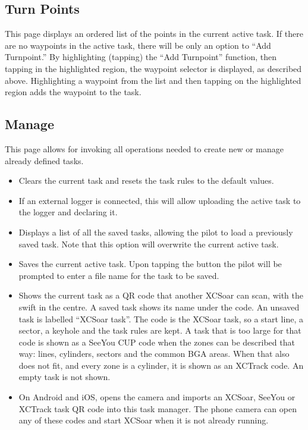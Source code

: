 \subsection*{Turn Points}
This page displays an ordered list of the points in the current active task.
If there are no waypoints in the active task, there
will be only an option to ``Add Turnpoint.''  By highlighting (tapping) the
``Add Turnpoint'' function, then tapping in the highlighted region, the waypoint
selector is displayed, as described above.  Highlighting a waypoint from the
list and then tapping on the highlighted region adds the waypoint to the task.

\subsection*{Manage}
This page allows for invoking all operations needed to create new or manage
already defined tasks.


\begin{itemize}
\item [\bmenuw{New Task}] Clears the current task and resets the task rules to
  the default values.
\item [\bmenuw{Declare}] If an external logger is connected, this will allow
  uploading the  active task to the logger and declaring it.
\item [\bmenuw{Browse}] Displays a list of all the saved tasks, allowing the
  pilot to load a previously saved task.  Note that this option will overwrite
  the current active task.
\item [\bmenuw{Save}] Saves the current active task.  Upon tapping the
   button the pilot will be prompted to enter a file name for the
  task to be saved.
\item [\bmenuw{Show QR Code}] Shows the current task as a QR code that
  another XCSoar can scan, with the swift in the centre.  A saved
  task shows its name under the code.  An unsaved task is labelled
  ``XCSoar task''.  The code is the XCSoar task, so a start line, a
  sector, a keyhole and the task rules are kept.  A task that is too
  large for that code is shown as a SeeYou CUP code when the zones
  can be described that way: lines, cylinders, sectors and the
  common BGA areas.  When that also does not fit, and every zone is a
  cylinder, it is shown as an XCTrack code.  An empty task is not
  shown.
\item [\bmenuw{Scan QR Code}] On Android and iOS, opens the camera and
  imports an XCSoar, SeeYou or XCTrack task QR code into this task manager.
  The phone camera can open any of these codes and start XCSoar when
  it is not already running.
\end{itemize}

